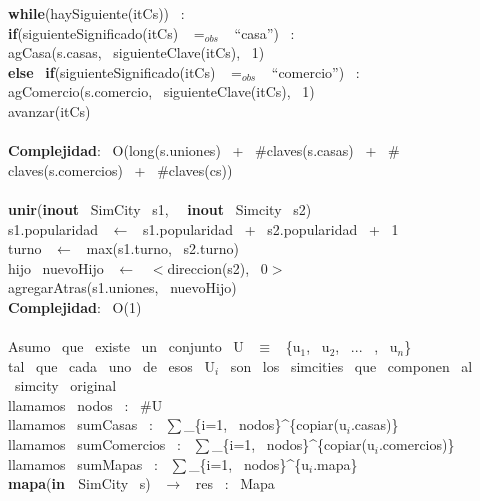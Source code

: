 \begin{Algoritmos}
\indent \textbf{while}(haySiguiente(itCs)) \ :\\
\indent \indent \textbf{if}(siguienteSignificado(itCs) \ $=_{obs}$ \ ``casa'') \ :\\
\indent \indent \indent agCasa(s.casas, \ siguienteClave(itCs), \ 1)\\
\indent \indent \textbf{else} \ \textbf{if}(siguienteSignificado(itCs) \ $=_{obs}$ \ ``comercio'') \ :\\
\indent \indent \indent agComercio(s.comercio, \ siguienteClave(itCs), \ 1)\\
\indent \indent avanzar(itCs)\\
\\
\textbf{Complejidad}: \ O(long(s.uniones) \ + \ $ \# $claves(s.casas) \ + \ $ \# $claves(s.comercios) \ + \ $ \# $claves(cs))\\
\noindent\makebox[\linewidth]{\rule{\textwidth}{0.4pt}}
\\
\noindent\makebox[\linewidth]{\rule{\textwidth}{0.4pt}}
\textbf{unir}(\textbf{inout} \ SimCity \ s1, \  \ \textbf{inout} \ Simcity \ s2)\\
\indent s1.popularidad \ $\leftarrow$ \ s1.popularidad \ + \ s2.popularidad \ + \ 1\\
\indent turno \ $\leftarrow$ \ max(s1.turno, \ s2.turno)\\
\indent hijo \ nuevoHijo \ $\leftarrow$ \ $<$direccion(s2), \ 0$>$\\
\indent agregarAtras(s1.uniones, \ nuevoHijo)\\
\textbf{Complejidad}: \ O(1)\\
\noindent\makebox[\linewidth]{\rule{\textwidth}{0.4pt}}
\\
Asumo \ que \ existe \ un \ conjunto \ U \ $\equiv$ \ \{u$_1$, \ u$_2$, \ ... \ , \ u$_n$\}\\
tal \ que \ cada \ uno \ de \ esos \ U$_i$ \ son \ los \ simcities \ que \ componen \ al \ simcity \ original\\
llamamos \ nodos \ : \ $ \# $U\\
llamamos \ sumCasas \ : \ $\sum$\_\{i=1, \ nodos\}\^{}\{copiar(u$_i$.casas)\}\\
llamamos \ sumComercios \ : \ $\sum$\_\{i=1, \ nodos\}\^{}\{copiar(u$_i$.comercios)\}\\
llamamos \ sumMapas \ : \ $\sum$\_\{i=1, \ nodos\}\^{}\{u$_i$.mapa\}\\
\noindent\makebox[\linewidth]{\rule{\textwidth}{0.4pt}}
\textbf{mapa}(\textbf{in \ }SimCity \ s) \ $\rightarrow $ \ res \ : \ Mapa \ \\

\end{Algoritmos}
